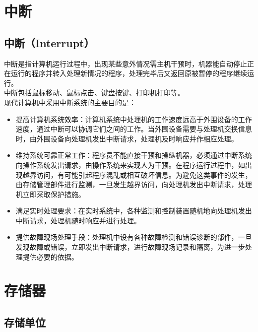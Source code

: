\newpage

\section{中断}

\subsection{中断（Interrupt）}

中断是指计算机运行过程中，出现某些意外情况需主机干预时，机器能自动停止正在运行的程序并转入处理新情况的程序，处理完毕后又返回原被暂停的程序继续运行。\\

中断包括鼠标移动、鼠标点击、键盘按键、打印机打印等。\\

现代计算机中采用中断系统的主要目的是：

\begin{itemize}
	\item 提高计算机系统效率：计算机系统中处理机的工作速度远高于外围设备的工作速度，通过中断可以协调它们之间的工作。当外围设备需要与处理机交换信息时，由外围设备向处理机发出中断请求，处理机及时响应并作相应处理。

	\item 维持系统可靠正常工作：程序员不能直接干预和操纵机器，必须通过中断系统向操作系统发出请求，由操作系统来实现人为干预。在程序运行过程中，如出现越界访问，有可能引起程序混乱或相互破坏信息。为避免这类事件的发生，由存储管理部件进行监测，一旦发生越界访问，向处理机发出中断请求，处理机立即采取保护措施。

	\item 满足实时处理要求：在实时系统中，各种监测和控制装置随机地向处理机发出中断请求，处理机随时响应并进行处理。

	\item 提供故障现场处理手段：处理机中设有各种故障检测和错误诊断的部件，一旦发现故障或错误，立即发出中断请求，进行故障现场记录和隔离，为进一步处理提供必要的依据。
\end{itemize}

\newpage

\section{存储器}

\subsection{存储单位}

